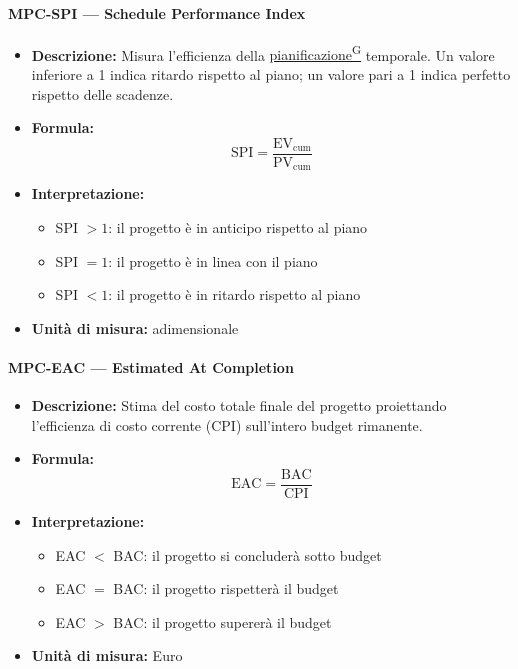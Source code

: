 \documentclass[a4paper,12pt]{article}
\providecommand{\glslink}[2]{\href{https://alittlebyte-19.github.io/Documentazione/glossario.html\#gls-#1}{\underline{#2}\textsuperscript{\scriptsize G}}}
\begin{document}
\paragraph{MPC-SPI --- Schedule Performance Index}
\begin{itemize}
    \item \textbf{Descrizione:} Misura l'efficienza della \glslink{pianificazione}{pianificazione} temporale. Un valore inferiore a 1 indica ritardo rispetto al piano; un valore pari a 1 indica perfetto rispetto delle scadenze.
    \item \textbf{Formula:}
    $$\text{SPI} = \frac{\text{EV}_{\text{cum}}}{\text{PV}_{\text{cum}}}$$
    \item \textbf{Interpretazione:}
    \begin{itemize}
        \item SPI $> 1$: il progetto è in anticipo rispetto al piano
        \item SPI $= 1$: il progetto è in linea con il piano
        \item SPI $< 1$: il progetto è in ritardo rispetto al piano
    \end{itemize}
    \item \textbf{Unità di misura:} adimensionale
\end{itemize}

\paragraph{MPC-EAC --- Estimated At Completion}
\begin{itemize}
    \item \textbf{Descrizione:} Stima del costo totale finale del progetto proiettando l'efficienza di costo corrente (CPI) sull'intero budget rimanente.
    \item \textbf{Formula:}
    $$\text{EAC} = \frac{\text{BAC}}{\text{CPI}}$$
    \item \textbf{Interpretazione:}
    \begin{itemize}
        \item EAC $<$ BAC: il progetto si concluderà sotto budget
        \item EAC $=$ BAC: il progetto rispetterà il budget
        \item EAC $>$ BAC: il progetto supererà il budget
    \end{itemize}
    \item \textbf{Unità di misura:} Euro
\end{itemize}
\end{document}
